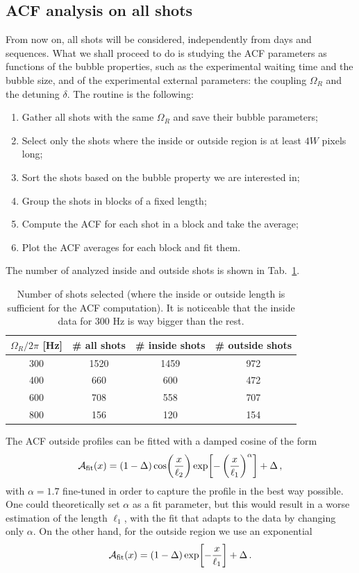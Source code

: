 \subsection{ACF analysis on all shots}
From now on, all shots will be considered, independently from days and sequences. What we shall proceed to do is studying the ACF parameters as functions of the bubble properties, such as the experimental waiting time and the bubble size, and of the experimental external parameters: the coupling $\Omega_R$ and the detuning $\delta$. 
The routine is the following:
\begin{enumerate}
    \item Gather all shots with the same $\Omega_R$ and save their bubble parameters;
    \item Select only the shots where the inside or outside region is at least $4W$ pixels long;
    \item Sort the shots based on the bubble property we are interested in;
    \item Group the shots in blocks of a fixed length;
    \item Compute the ACF for each shot in a block and take the average;
    \item Plot the ACF averages for each block and fit them.
\end{enumerate}
The number of analyzed inside and outside shots is shown in Tab.\ \ref{tab:shots}.
\begin{table}
    \centering
    \begin{tabular}{c|c|c|c}
        $\Omega_R/2\pi$ [\unit{\hertz}] & \# all shots & \# inside shots & \# outside shots \\
        \hline
        300 & 1520 & 1459 & 972\\   
        400 & 660 & 600 & 472\\
        600 & 708 & 558 & 707\\
        800 & 156 & 120 & 154\\     
    \end{tabular}
    \caption{Number of shots selected (where the inside or outside length is sufficient for the ACF computation). It is noticeable that the inside data for 300 \unit{\hertz} is way bigger than the rest.}
    \label{tab:shots}
\end{table}
The ACF outside profiles can be fitted with a damped cosine of the form
\begin{equation*}
    \mathcal{A}_{\rm fit}(x) = (1 - \Delta)\cos(\frac{x}{\ell_2})\exp[-\left(\frac{x}{\ell_1}\right)^\alpha] + \Delta\, ,
\end{equation*}
with $\alpha = 1.7$ fine-tuned in order to capture the profile in the best way possible. One could theoretically set $\alpha$ as a fit parameter, but this would result in a worse estimation of the length $\ell_1$, with the fit that adapts to the data by changing only $\alpha$. On the other hand, for the outside region we use an exponential
\begin{equation*}
    \mathcal{A}_{\rm fit}(x) = (1-\Delta)\exp[-\frac{x}{\ell_1}] + \Delta\, .
\end{equation*}

